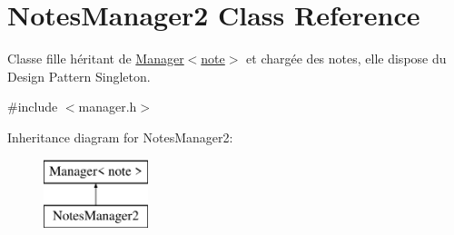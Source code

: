 \hypertarget{class_notes_manager2}{}\section{Notes\+Manager2 Class Reference}
\label{class_notes_manager2}


Classe fille héritant de \hyperlink{class_manager}{Manager$<$note$>$} et chargée des notes, elle dispose du Design Pattern Singleton.  




{\ttfamily \#include $<$manager.\+h$>$}

Inheritance diagram for Notes\+Manager2\+:\begin{figure}[H]
\begin{center}
\leavevmode
\includegraphics[height=2.000000cm]{class_notes_manager2}
\end{center}
\end{figure}
